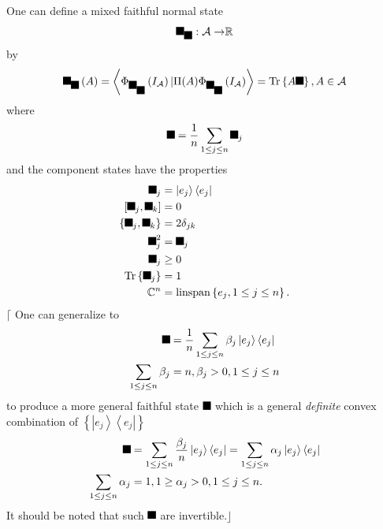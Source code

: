 \documentclass[aps,preprint]{revtex4}%
\providecommand{\U}[1]{\protect\rule{.1in}{.1in}}
\begin{document}
One can define a mixed faithful normal state
\begin{equation}
\U{3c9} _{\U{3c1} }:\mathcal{A\rightarrow}\mathbb{R}%
\end{equation}
by
\begin{equation}
\U{3c9} _{\U{3c1} }\left(  A\right)  =\left\langle \Phi_{\U{3c9} _{\U{3c1} }%
}\left(  I_{\mathcal{A}}\right)  |\Pi(A)\Phi_{\U{3c9} _{\U{3c1} }}\left(
I_{\mathcal{A}}\right)  \right\rangle =\operatorname{Tr}\left\{  A\U{3c1}
\right\}  ,A\in\mathcal{A}%
\end{equation}
where
\begin{equation}
\U{3c1} =\frac{1}{n}\sum_{1\leq j\leq n}\U{3c1} _{j}%
\end{equation}
and the component states have the properties
\begin{align}
\U{3c1} _{j}  &  =\left\vert e_{j}\right\rangle \left\langle e_{j}\right\vert
\\
\left[  \U{3c1} _{j},\U{3c1} _{k}\right]   &  =0\\
\left\{  \U{3c1} _{j},\U{3c1} _{k}\right\}   &  =2\delta_{jk}\\
\U{3c1} _{j}^{2}  &  =\U{3c1} _{j}\\
\U{3c1} _{j}  &  \geq0\\
\operatorname{Tr}\left\{  \U{3c1} _{j}\right\}   &  =1\\
\mathbb{C}^{n}  &  =\operatorname*{linspan}\left\{  e_{j},1\leq j\leq
n\right\}  .
\end{align}
$\lceil$ One can generalize to
\begin{align}
\U{3c1}  &  =\frac{1}{n}\sum_{1\leq j\leq n}\beta_{j}\left\vert e_{j}%
\right\rangle \left\langle e_{j}\right\vert \\
\sum_{1\leq j\leq n}\beta_{j}  &  =n,\beta_{j}>0,1\leq j\leq n
\end{align}
to produce a more general faithful state $\U{3c1} \ $which is a general
\emph{definite }convex combination of $\left\{  \left\vert e_{j}\right\rangle
\left\langle e_{j}\right\vert \right\}  $
\begin{align}
\U{3c1}  &  =\sum_{1\leq j\leq n}\frac{\beta_{j}}{n}\left\vert e_{j}%
\right\rangle \left\langle e_{j}\right\vert =\sum_{1\leq j\leq n}\alpha
_{j}\left\vert e_{j}\right\rangle \left\langle e_{j}\right\vert \\
\sum_{1\leq j\leq n}\alpha_{j}  &  =1,1\geq\alpha_{j}>0,1\leq j\leq n.
\end{align}
It should be noted that such $\U{3c1} $ are invertible.$\rfloor$
\end{document}
